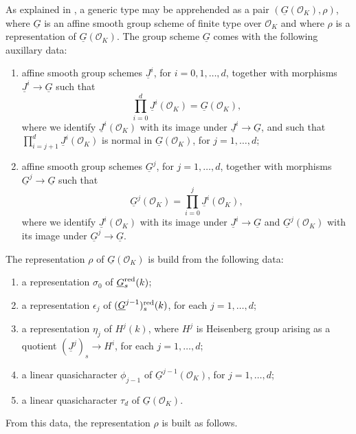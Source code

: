 \documentclass[10pt]{amsart}
\theoremstyle{plain}
\theoremstyle{definition}
\newcommand{\OK}{\mathcal{O}_K}
\newcommand{\Fq}{k}
\begin{document}
As explained in \cite{yu:models}, a generic type may be apprehended as a pair $(\underline{G}(\OK), \rho)$, where $\underline{G}$ is an affine smooth group scheme of finite type over $\OK$ and where $\rho$ is a representation of $\underline{G}(\OK)$.
The group scheme $\underline{G}$ comes with the following auxillary data:
\begin{enumerate}
\item
	affine smooth group schemes $\underline{J}^i$, for $i=0, 1, \ldots, d$, together with morphisms $\underline{J}^i \to \underline{G}$ such that \[\prod_{i=0}^d \underline{J}^i(\OK) = \underline{G}(\OK),\] where we identify $\underline{J}^i(\OK)$ with its image under $\underline{J}^i \to \underline{G}$, and such that $\prod_{i=j+1}^{d} \underline{J}^i(\OK)$ is normal in $\underline{G}(\OK)$, for $j=1, \ldots, d$;
\item affine smooth group schemes $\underline{G}^{j}$, for $j=1, \ldots, d$, together with morphisms $\underline{G}^{j}\to \underline{G}$ such that 
\[
\underline{G}^{j}(\OK) = \prod_{i=0}^{j} \underline{J}^i(\OK),
\] 
where we identify $\underline{J}^i(\OK)$ with its image under $\underline{J}^i \to \underline{G}$ and $\underline{G}^{j}(\OK)$ with its image under $\underline{G}^j \to \underline{G}$.
\end{enumerate}
The representation $\rho$ of $\underline{G}(\OK)$ is build from the following data:
\begin{enumerate}
\item
	a representation $\sigma_0$ of $\underline{G}_s\red(\Fq)$;
\item
	a representation $\epsilon_j$ of $(\underline{G}^{j-1})_s\red(\Fq)$, for each $j=1,\ldots, d$;
\item
	a representation $\eta_j$ of $H^j(\Fq)$, where $H^j$ is Heisenberg group arising as a quotient $(\underline{J}^{j})_s \to H^i$, for each $j=1,\ldots, d$;
\item
	a linear quasicharacter $\phi_{j-1}$ of $\underline{G}^{j-1}(\OK)$, for $j=1,\ldots, d$;
\item
	a linear quasicharacter $\tau_d$ of $\underline{G}(\OK)$.
\end{enumerate}
From this data, the representation $\rho$ is built as follows.
\end{document}
